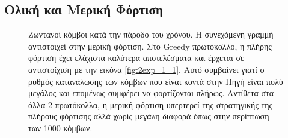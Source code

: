 \subsection{Ολική και Μερική Φόρτιση}\label{subc:result5_2}
\begin{figure}[H]
  \centering
  \caption{Ζωντανοί κόμβοι κατά την πάροδο του χρόνου. Η συνεχόμενη γραμμή αντιστοιχεί στην μερική φόρτιση. Στο Greedy πρωτόκολλο, η πλήρης φόρτιση έχει
ελάχιστα καλύτερα αποτελέσματα και έρχεται σε αντιστοίχιση με την εικόνα \ref{fig:2exp_1_1}. Αυτό συμβαίνει γιατί ο ρυθμός κατανάλωσης των κόμβων που είναι κοντά
στην Πηγή είναι πολύ μεγάλος και επομένως συμφέρει να φορτίζονται πλήρως. Αντίθετα στα άλλα 2 πρωτόκολλα, η μερική φόρτιση υπερτερεί της στρατηγικής της πλήρους
φόρτισης αλλά χωρίς μεγάλη διαφορά όπως στην περίπτωση των 1000 κόμβων.}
  \label{fig:5_2exp_1_1}
\end{figure}

